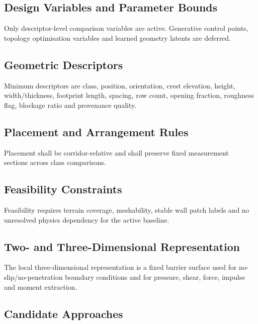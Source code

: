 \subsection{Design Variables and Parameter Bounds}
\label{sec:res-geo-spec-design-variables-parameter-bounds}

Only descriptor-level comparison variables are active. Generative
control points, topology optimisation variables and learned geometry
latents are deferred.

\subsection{Geometric Descriptors}
\label{sec:res-geo-spec-geometric-descriptors}

Minimum descriptors are class, position, orientation, crest elevation,
height, width/thickness, footprint length, spacing, row count, opening
fraction, roughness flag, blockage ratio and provenance quality.

\subsection{Placement and Arrangement Rules}
\label{sec:res-geo-spec-placement-arrangement-rules}

Placement shall be corridor-relative and shall preserve fixed
measurement sections across class comparisons.

\subsection{Feasibility Constraints}
\label{sec:res-geo-spec-feasibility-constraints}

Feasibility requires terrain coverage, meshability, stable wall patch
labels and no unresolved physics dependency for the active baseline.

\subsection{Two- and Three-Dimensional Representation}
\label{sec:res-geo-spec-two-three-dimensional-representation}

The local three-dimensional representation is a fixed barrier surface
used for no-slip/no-penetration boundary conditions and for pressure,
shear, force, impulse and moment extraction.

\subsection{Candidate Approaches}
\label{sec:res-geo-spec-candidate-approaches}

